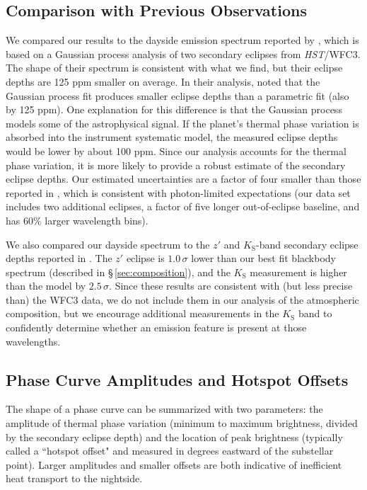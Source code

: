 \documentclass[twocolumn]{aastex61}
\newcommand{\project}[1]{\textsl{#1}}
\newcommand{\HST}{\project{HST}}
\begin{document}


\subsection{Comparison with Previous Observations}
We compared our results to the dayside emission spectrum reported by \cite{cartier17}, which is based on a Gaussian process analysis of two secondary eclipses from \HST/WFC3. The shape of their spectrum is consistent with what we find, but their eclipse depths are 125 ppm smaller on average. In their analysis, \cite{cartier17} noted that the Gaussian process fit produces smaller eclipse depths than a parametric fit (also by 125 ppm). One explanation for this difference is that the Gaussian process models some of the astrophysical signal. If the planet's thermal phase variation is absorbed into the instrument systematic model, the measured eclipse depths would be lower by about 100 ppm. Since our analysis accounts for the thermal phase variation, it is more likely to provide a robust estimate of the secondary eclipse depths.  Our estimated uncertainties are a factor of four smaller than those reported in \cite{cartier17}, which is consistent with photon-limited expectations (our data set includes two additional eclipses, a factor of five longer out-of-eclipse baseline, and has 60\% larger wavelength bins).

We also compared our dayside spectrum to the $z'$ and $K_\mathrm{S}$-band secondary eclipse depths reported in \cite{delrez18}. The $z'$ eclipse is $1.0\,\sigma$ lower than our best fit blackbody spectrum (described in \S\,\ref{sec:composition}), and the $K_\mathrm{S}$ measurement is higher than the model by $2.5\,\sigma$. Since these results are consistent with (but less precise than) the WFC3 data, we do not include them in our analysis of the atmospheric composition, but we encourage additional measurements in the $K_\mathrm{S}$ band to confidently determine whether an emission feature is present at those wavelengths.

\subsection{Phase Curve Amplitudes and Hotspot Offsets}
The shape of a phase curve can be summarized with two parameters: the amplitude of thermal phase variation (minimum to maximum brightness, divided by the secondary eclipse depth) and the location of peak brightness (typically called a ``hotspot offset" and measured in degrees eastward of the substellar point). Larger amplitudes and smaller offsets are both indicative of inefficient heat transport to the nightside.
\end{document}
